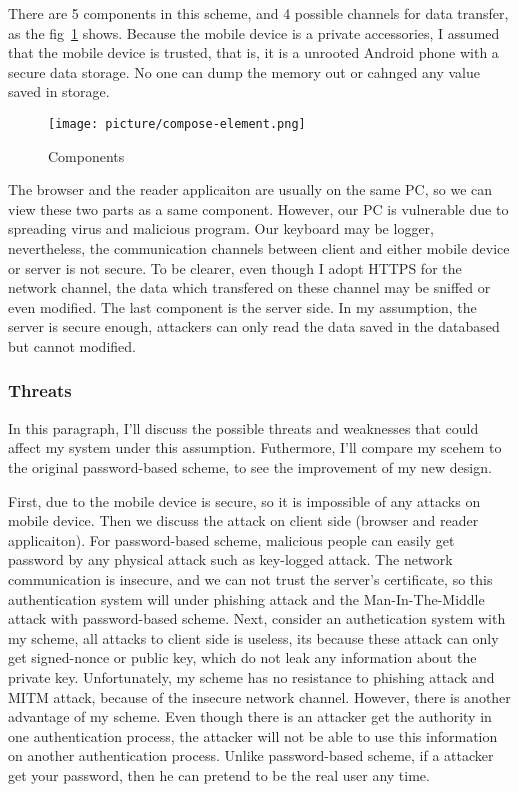 \begin{CJK}{Bg5}{bsmi}
There are 5 components in this scheme, and 4 possible channels for data transfer, as the fig~\ref{fig:compose-element} shows. Because the mobile device is a private accessories, I assumed that the mobile device is trusted, that is, it is a unrooted Android phone with a secure data storage. No one can dump the memory out or cahnged any value saved in storage. 

\begin{figure}
\centering
\texttt{[image: picture/compose-element.png]}
\caption{Components}
\label{fig:compose-element}
\end{figure}

The browser and the reader applicaiton are usually on the same PC, so we can view these two parts as a same component. However, our PC is vulnerable due to spreading virus and malicious program. Our keyboard may be logger, nevertheless, the communication channels between client and either mobile device or server is not secure. To be clearer, even though I adopt HTTPS for the network channel, the data which transfered on these channel may be sniffed or even modified. The last component is the server side. In my assumption, the server is secure enough, attackers can only read the data saved in the databased but cannot modified.

\subsubsection{Threats}

In this paragraph, I'll discuss the possible threats and weaknesses that could affect my system under this assumption. Futhermore, I'll compare my scehem to the original password-based scheme, to see the improvement of my new design.

First, due to the mobile device is secure, so it is impossible of any attacks on mobile device. Then we discuss the attack on client side (browser and reader applicaiton). For password-based scheme, malicious people can easily get password by any physical attack such as key-logged attack. The network communication is insecure, and we can not trust the server's certificate, so this authentication system will under phishing attack and the Man-In-The-Middle attack with password-based scheme. Next, consider an authetication system with my scheme, all attacks to client side is useless, its because these attack can only get signed-nonce or public key, which do not leak any information about the private key. Unfortunately, my scheme has no resistance to phishing attack and MITM attack, because of the insecure network channel. However, there is another advantage of my scheme. Even though there is an attacker get the authority in one authentication process, the attacker will not be able to use this information on another authentication process. Unlike password-based scheme, if a attacker get your password, then he can pretend to be the real user any time.


\end{CJK}

